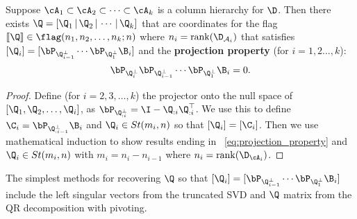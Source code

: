 \begin{comment}
\begin{dfn}[Projection property]\label{def:projection_property}
     $[\![\Q]\!]$ satisfies the projection property relative to $\D$ when, for $i=1,2,\cdots,k$,
    \begin{equation}\label{eq:projection_property}
    \bP_{\Q_i^\perp}\bP_{\Q_{i-1}^\perp}\cdots \bP_{\Q_1^\perp} \B_i = 0.
    \end{equation}
\end{dfn}
\end{comment}


\begin{prop}\label{prop:stiefel_coords}
    Suppose $\cA_1 \subset \cA_2 \subset \cdots \subset \cA_k$ is a column hierarchy for $\D$. Then there exists $\Q= [\Q_1\,|\,\Q_2\,|\, \cdots\,|\,\Q_k]$ that are coordinates for the flag $[\![\Q]\!]\in\flag(n_1,n_2,\dots,n_k;n)$ where $n_i = \mathrm{rank}(\D_{\mathcal{A}_i})$ that satisfies $[\Q_i] = [\bP_{\Q_{i-1}^\perp}\cdots \bP_{\Q_1^\perp}\B_i]$ and the \textbf{projection property} (for $i=1,2\dots,k$): 
    \begin{equation}\label{eq:projection_property}
    \bP_{\Q_i^\perp}\bP_{\Q_{i-1}^\perp}\cdots \bP_{\Q_1^\perp} \B_i = 0.
    \end{equation}
\end{prop}
\begin{proof}
    Define (for $i=2,3,\dots,k$) the projector onto the null space of $[\Q_1,\Q_2,\dots,\Q_i]$, as $\bP_{\Q_{:i}^\perp} = \I - \Q_{:i}\Q_{:i}^\top$. We use this to define $\C_i = \bP_{\Q_{:i-1}^\perp}\B_i$ and $\Q_i \in St(m_i,n)$ so that $[\Q_i] = [\C_i]$. Then we use mathematical induction to show results ending in ~\cref{eq:projection_property} and $\Q_i \in St(m_i,n)$ with $m_i = n_i - n_{i-1}$ where $n_i = \mathrm{rank}(\D_{\cA_i})$.
\end{proof}
\begin{comment}
\begin{proof}
    Existence of $\Q$ follows from the recursion $\mathbf{P}_{\Q_i^\perp}^\prime = \Q_i \Q_i^\top + \bP_{\Q_i^\perp} \mathbf{P}^\prime_{\Q_{i-1}^\perp}$ (with $\mathbf{P}^\prime_{\Q_0^\perp} = \mathbf{0}$). The projection property is proved using
    \begin{equation*}
        (\bP_{\Q^\perp_{i-1}} \cdots \bP_{\Q^\perp_1} \B_i)^\top (\bP_{\Q^\perp_{j-1}} \cdots \bP_{\Q^\perp_1} \B_j) = \boldsymbol{0}
    \end{equation*}
    for all $j \neq i$ and $[\Q_i] = [\bP_{\Q_{i-1}^\perp}\cdots \bP_{\Q_1^\perp}\B_i]$.
\end{proof}
\end{comment}
The simplest methods for recovering $\Q$ so that $[\Q_i] = [\bP_{\Q_{i-1}^\perp}\cdots \bP_{\Q_1^\perp}\B_i]$ include the left singular vectors from the truncated SVD and $\Q$ matrix from the QR decomposition with pivoting. 

